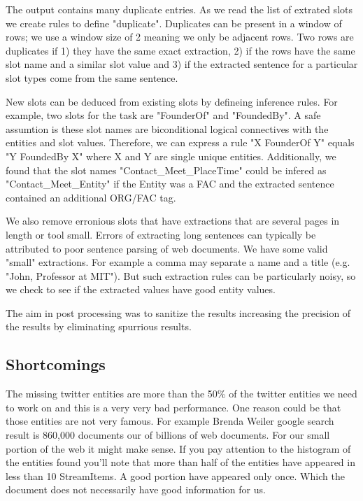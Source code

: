 The output contains many duplicate entries. As we read the list of extrated slots we create rules to define "duplicate". Duplicates can be present in a window of rows; we use a window size of 2 meaning we only be adjacent rows. Two rows are duplicates if 1) they have the same exact extraction, 2) if the rows have the same slot name and a similar slot value and 3) if the extracted sentence for a particular slot types come from the same sentence.

 New slots can be deduced from existing slots by defineing inference rules. For example, two slots for the task are "FounderOf" and "FoundedBy". A safe assumtion is these slot names are biconditional logical connectives with the entities and slot values. Therefore, we can express a rule "X FounderOf Y" equals "Y FoundedBy X" where X and Y are single unique entities. Additionally, we found that the slot names "Contact\_Meet\_PlaceTime" could be infered as "Contact\_Meet\_Entity" if the Entity was a FAC and the extracted sentence contained an additional ORG/FAC tag. 
 
We also remove erronious slots that have extractions that are several pages in length or tool small. Errors of extracting long sentences can typically be attributed to poor sentence parsing of web documents. We have some valid "small" extractions. For example a comma may separate a name and a title (e.g. "John, Professor at MIT"). But such extraction rules can be particularly noisy, so we check to see if the extracted values have good entity values.

The aim in post processing was to sanitize the results increasing the precision of the results by eliminating spurrious results.

\subsection{Shortcomings}

The missing twitter entities are more than the 50\% of the twitter entities we need to work on and this is a very very bad performance. One reason could be that those entities are not very famous. For example Brenda Weiler google search result is 860,000 documents our of billions of web documents. For our small portion of the web it might make sense. If you pay attention to the histogram of the entities found you'll note that more than half of the entities have appeared in less than 10 StreamItems. A good portion have appeared only once. Which the document does not necessarily have good information for us.

